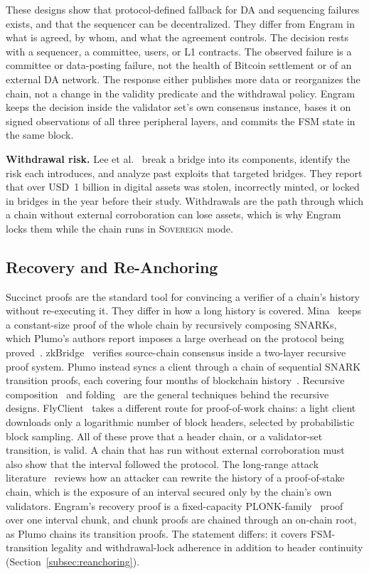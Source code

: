 These designs show that protocol-defined fallback for DA and sequencing
failures exists, and that the sequencer can be decentralized. They differ from
Engram in what is agreed, by whom, and what the agreement controls. The
decision rests with a sequencer, a committee, users, or L1 contracts. The
observed failure is a committee or data-posting failure, not the health of
Bitcoin settlement or of an external DA network. The response
either publishes more data or reorganizes the chain, not a change in the
validity predicate and the withdrawal policy. Engram keeps the decision inside the validator set's own consensus
instance, bases it on signed observations of all three peripheral layers, and
commits the FSM state in the same block.

\textbf{Withdrawal risk.}
Lee et al.~\cite{lee2023bridges} break a bridge into its components, identify
the risk each introduces, and analyze past exploits that targeted bridges. They
report that over USD~1 billion in digital assets was stolen, incorrectly
minted, or locked in bridges in the year before their study. Withdrawals are the
path through which a chain without external corroboration can lose assets,
which is why Engram locks them while the chain runs in \textsc{Sovereign} mode.

\subsection{Recovery and Re-Anchoring}
\label{subsec:rw-recovery}
Succinct proofs are the standard tool for convincing a verifier of a chain's
history without re-executing it. They differ in how a long history is covered.
Mina~\cite{bonneau2020mina} keeps a constant-size proof of the whole chain by
recursively composing SNARKs, which Plumo's authors report imposes a large
overhead on the protocol being proved~\cite{vesely2022plumo}. zkBridge~\cite{xie2022zkbridge}
verifies source-chain consensus inside a two-layer recursive proof system.
Plumo instead syncs a client through a chain of sequential SNARK transition
proofs, each covering four months of blockchain history~\cite{vesely2022plumo}.
Recursive composition~\cite{bitansky2013recursive,bowe2019halo} and
folding~\cite{kothapalli2022nova} are the general techniques behind the
recursive designs. FlyClient~\cite{bunz2020flyclient} takes a different route
for proof-of-work chains: a light client downloads only a logarithmic number of
block headers, selected by probabilistic block sampling.
All of these prove that a header chain, or a validator-set transition, is
valid. A chain that has run without external corroboration must also show that
the interval followed the protocol. The long-range attack
literature~\cite{deirmentzoglou2019longrange} reviews how an attacker can
rewrite the history of a proof-of-stake chain, which is the exposure of an
interval secured only by the chain's own validators. Engram's recovery proof is
a fixed-capacity PLONK-family~\cite{gabizon2019plonk} proof over one interval
chunk, and chunk proofs are chained through an on-chain root, as Plumo chains
its transition proofs. The statement differs: it covers FSM-transition legality
and withdrawal-lock adherence in addition to header continuity
(Section~\ref{subsec:reanchoring}).

